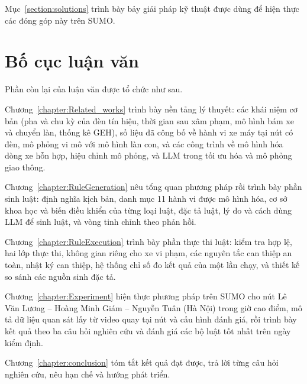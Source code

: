 \documentclass[../main.tex]{subfiles}
\begin{document}
Mục~\ref{section:solutions} trình bày bảy giải pháp kỹ thuật được dùng để hiện thực các đóng góp này trên SUMO.

\section{Bố cục luận văn}
\label{section:1.4}

Phần còn lại của luận văn được tổ chức như sau.

Chương~\ref{chapter:Related_works} trình bày nền tảng lý thuyết: các khái niệm cơ bản (pha và chu kỳ của đèn tín hiệu, thời gian sau xâm phạm, mô hình bám xe và chuyển làn, thống kê GEH), số liệu đã công bố về hành vi xe máy tại nút có đèn, mô phỏng vi mô với mô hình làn con, và các công trình về mô hình hóa dòng xe hỗn hợp, hiệu chỉnh mô phỏng, và LLM trong tối ưu hóa và mô phỏng giao thông.

Chương~\ref{chapter:RuleGeneration} nêu tổng quan phương pháp rồi trình bày phần sinh luật: định nghĩa kịch bản, danh mục 11 hành vi được mô hình hóa, cơ sở khoa học và biến điều khiển của từng loại luật, đặc tả luật, lý do và cách dùng LLM để sinh luật, và vòng tinh chỉnh theo phản hồi.

Chương~\ref{chapter:RuleExecution} trình bày phần thực thi luật: kiểm tra hợp lệ, hai lớp thực thi, không gian riêng cho xe vi phạm, các nguyên tắc can thiệp an toàn, nhật ký can thiệp, hệ thống chỉ số đo kết quả của một lần chạy, và thiết kế so sánh các nguồn sinh đặc tả.

Chương~\ref{chapter:Experiment} hiện thực phương pháp trên SUMO cho nút Lê Văn Lương -- Hoàng Minh Giám -- Nguyễn Tuân (Hà Nội) trong giờ cao điểm, mô tả dữ liệu quan sát lấy từ video quay tại nút và cấu hình đánh giá, rồi trình bày kết quả theo ba câu hỏi nghiên cứu và đánh giá các bộ luật tốt nhất trên ngày kiểm định.

Chương~\ref{chapter:conclusion} tóm tắt kết quả đạt được, trả lời từng câu hỏi nghiên cứu, nêu hạn chế và hướng phát triển.
\end{document}
